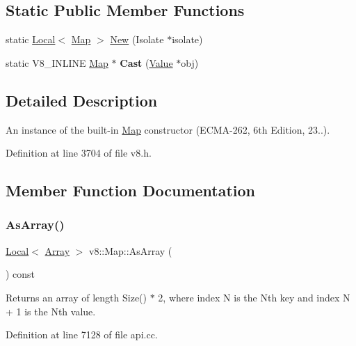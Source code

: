 \subsection*{Static Public Member Functions}
\begin{DoxyCompactItemize}
\item 
static \mbox{\hyperlink{classv8_1_1Local}{Local}}$<$ \mbox{\hyperlink{classv8_1_1Map}{Map}} $>$ \mbox{\hyperlink{classv8_1_1Map_a4126e8c0d6127119157986f1316380c2}{New}} (Isolate $\ast$isolate)
\item 
\mbox{\label{classv8_1_1Map_ac53aafed02f275a7d3ce6da8cfd060c3}} 
static V8\+\_\+\+I\+N\+L\+I\+NE \mbox{\hyperlink{classv8_1_1Map}{Map}} $\ast$ {\bfseries Cast} (\mbox{\hyperlink{classv8_1_1Value}{Value}} $\ast$obj)
\end{DoxyCompactItemize}


\subsection{Detailed Description}
An instance of the built-\/in \mbox{\hyperlink{classv8_1_1Map}{Map}} constructor (E\+C\+M\+A-\/262, 6th Edition, 23..). 

Definition at line 3704 of file v8.\+h.



\subsection{Member Function Documentation}
\mbox{\label{classv8_1_1Map_a0d3173740c212cca579fc19249eb5c90}} 
\subsubsection{\texorpdfstring{As\+Array()}{AsArray()}}
{\footnotesize\ttfamily \mbox{\hyperlink{classv8_1_1Local}{Local}}$<$ \mbox{\hyperlink{classv8_1_1Array}{Array}} $>$ v8\+::\+Map\+::\+As\+Array (\begin{DoxyParamCaption}{ }\end{DoxyParamCaption}) const}

Returns an array of length Size() $\ast$ 2, where index N is the Nth key and index N + 1 is the Nth value. 

Definition at line 7128 of file api.\+cc.

